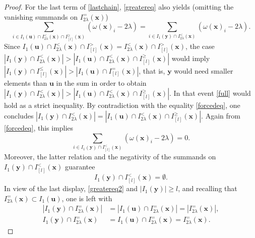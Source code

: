 \documentclass[11pt,a4paper]{article}
\theoremstyle{plain}
\theoremstyle{definition}
\theoremstyle{remark}
\newcommand*\x{\mathbf{x}}
\newcommand*\U{\mathbf{u}}
\newcommand*\y{\mathbf{y}}
\begin{document}
\begin{proof}
  For the last term of \eqref{lastchain}, \eqref{greatereq} also yields
  (omitting the vanishing summands on \(I_{2\lambda}^=(\x)\))
  \begin{equation}
    \label{forcedeq}
    \sum_{i \in I_1(\U)\cap I_{2\lambda}^<(\x)\cap I_{[l]}^\geq(\x)}\left(\omega(\x)_i-2 \lambda\right)= \sum_{i \in I_1(\y) \cap I_{2\lambda}^<(\x)}\left(\omega(\x)_i-2 \lambda\right).
  \end{equation}
  Since \(I_1(\U)\cap I_{2\lambda}^<(\x)\cap I_{[l]}^>(\x)=I_{2\lambda}^<(\x)\cap I_{[l]}^>(\x)\), the case \(|I_1(\y) \cap I_{2\lambda}^<(\x)|> |I_1(\U)\cap I_{2\lambda}^<(\x)\cap I_{[l]}^\geq(\x)|\) would imply \(|I_1(\y) \cap I_{[l]}^\leq(\x)|>|I_1(\U) \cap I_{[l]}^=(\x)|\), that is, \(\y\) would need smaller elements than \(\U\) in the sum in order to obtain \(|I_1(\y) \cap I_{2\lambda}^<(\x)|> |I_1(\U)\cap I_{2\lambda}^<(\x)\cap I_{[l]}^\geq(\x)|\).
  In that event \eqref{full} would hold as a strict inequality.
  By contradiction with the equality \eqref{forcedeq}, one concludes \(|I_1(\y) \cap I_{2\lambda}^<(\x)|= |I_1(\U)\cap I_{2\lambda}^<(\x)\cap I_{[l]}^\geq(\x)|\).
  Again from \eqref{forcedeq}, this implies $$ \sum_{i \in I_1(\y) \cap I^<_{[l]}(\x)}\left(\omega(\x)_i-2 \lambda\right)=0.
  $$
  Moreover, the latter relation and the negativity of the summands on
  \(I_1(\y) \cap I^<_{[l]}(\x)\) guarantee
  \begin{equation}\label{ylesser}
    I_1(\y) \cap I^<_{[l]}(\x)=\emptyset.
  \end{equation}
  In view of the last display, \eqref{greatereq2} and \(|I_1(\y)|\geq l\), and
  recalling that \(I^=_{2\lambda}(\x)\subset I_1(\U)\), one is left with
  \begin{equation}\label{yequals}
    \begin{aligned}
      |I_1(\y) \cap I^=_{2\lambda}(\x)|
       & = |I_1(\U) \cap I^=_{2\lambda}(\x)|
      = |I^=_{2\lambda}(\x)|,                \\
      I_1(\y) \cap I^=_{2\lambda}(\x)
       & = I_1(\U) \cap I^=_{2\lambda}(\x)
      = I^=_{2\lambda}(\x).
    \end{aligned}
  \end{equation}


\end{proof}
\end{document}
